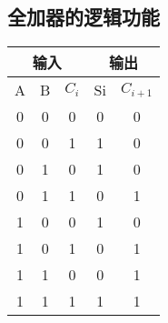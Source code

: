 \documentclass{article}
\begin{document}
\subsection{全加器的逻辑功能}
\begin{table}[h]
  \centering  
  \begin{tabular}{c|c|c|c|c}
      \hline
      \multicolumn{3}{c}{输入} \vline  &  \multicolumn{2}{c}{输出} \vline     \\ \hline
            A             & B    &$C_i $   &  Si               & $ C_{i+1} $  \\ \hline
            0             & 0    &0        &   0               & 0            \\ \hline
            0             & 0    &1        &   1               & 0            \\ \hline
            0             & 1    &0        &   1               & 0            \\ \hline
            0             & 1    &1        &   0               & 1            \\ \hline
            1             & 0    &0        &   1               & 0            \\ \hline
            1             & 0    &1        &   0               & 1            \\ \hline
            1             & 1    &0        &   0               & 1            \\ \hline
            1             & 1    &1        &   1               & 1            \\ \hline
          \end{tabular}
\end{table}
\end{document}
